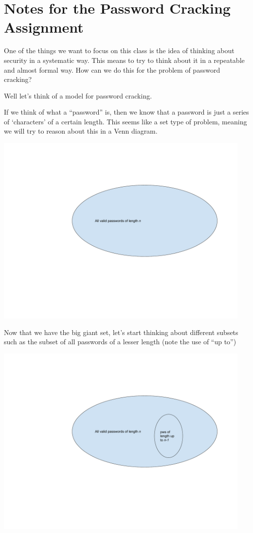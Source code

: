 \chapter{Notes for the Password Cracking Assignment}

One of the things we want to focus on this class is the idea of thinking about security in a systematic way. This means to try to think about it in a repeatable and almost formal way. How can we do this for the problem of password cracking? 

Well let’s think of a model for password cracking.


If we think of what a “password” is, then we know that a password is just a series of ‘characters’ of a certain length. This seems like a set type of problem, meaning we will try to reason about this in a Venn diagram.

\includegraphics[width=5in]{Assignments/images/PasswordCracking_1}

Now that we have the big giant set, let’s start thinking about different subsets such as the subset of all passwords of a lesser length (note the use of ``up to'')

\includegraphics[width=5in]{Assignments/images/PasswordCracking_2}

